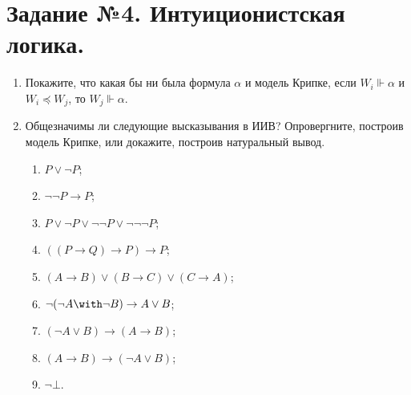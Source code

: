 \documentclass[10pt,a4paper,oneside]{article}
\begin{document}
\section*{Задание №4. Интуиционистская логика.}

\begin{enumerate}
\item Покажите, что какая бы ни была формула $\alpha$ и модель Крипке,
если $W_i \Vdash \alpha$ и $W_i \preceq W_j$, то $W_j \Vdash \alpha$.

\item Общезначимы ли следующие высказывания в ИИВ? Опровергните, построив модель Крипке, или докажите, построив натуральный вывод. 
\begin{enumerate}
\item $P \vee \neg P$;
\item $\neg\neg P \rightarrow P$;
\item $P \vee \neg P \vee \neg\neg P \vee \neg\neg\neg P$;
\item $((P \rightarrow Q) \rightarrow P) \rightarrow P$;
\item $(A \rightarrow B) \vee (B \rightarrow C) \vee (C \rightarrow A)$;
\item $\neg(\neg A \with \neg B) \rightarrow A \vee B$;
\item $(\neg A \vee B) \rightarrow (A \rightarrow B)$;
\item $(A \rightarrow B) \rightarrow (\neg A \vee B)$;
\item $\neg\bot$.
\end{enumerate}


\end{enumerate}
\end{document}
